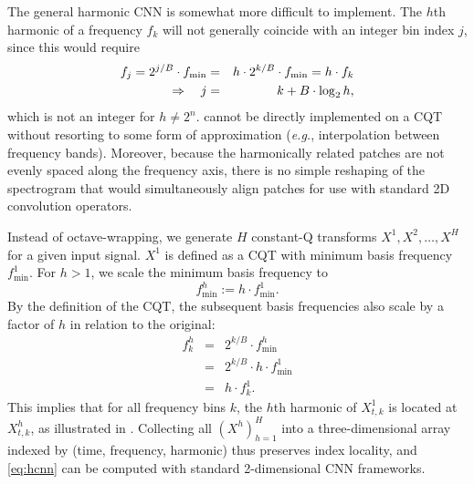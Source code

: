 \documentclass{article}
\begin{document}
The general harmonic CNN is somewhat more difficult to implement.
The $h$th harmonic of a frequency $f_k$ will not generally coincide with an integer bin index $j$, since this would require
\begin{eqnarray}
    f_j = 2^{j/B} \cdot f_{\min} &=& h \cdot 2^{k/B}\cdot f_{\min} = h \cdot f_k \notag \\
\Rightarrow \quad j &=& k + B \cdot \log_2 h,
\end{eqnarray}
which is not an integer for $h \neq 2^n$.
 cannot be directly implemented on a CQT without resorting to some form of approximation (\emph{e.g.}, interpolation between frequency bands).
Moreover, because the harmonically related patches are not evenly spaced along the frequency axis, there is no simple reshaping of the spectrogram that would simultaneously align patches for use with standard 2D convolution operators.

Instead of octave-wrapping, we generate $H$ constant-Q transforms $X^1, X^2, \dots, X^H$ for a given input signal.
$X^1$ is defined as a CQT with minimum basis frequency $f^1_{\min}$.
For $h > 1$, we scale the minimum basis frequency to
\begin{equation}
    f^h_{\min} := h \cdot f^1_{\min}.\label{eq:fmin}
\end{equation}
By the definition of the CQT, the subsequent basis frequencies also scale by a factor of $h$ in relation to the original:
\begin{eqnarray}
    f^h_k &=& 2^{k/B} \cdot f^h_{\min}\\
        &=& 2^{k/B} \cdot h \cdot f^1_{\min}\\
    &=& h \cdot f^1_k.
\end{eqnarray}
This implies that for all frequency bins $k$, the $h$th harmonic of $X^1_{t, k}$ is located at $X^h_{t, k}$, as illustrated in .
Collecting all $(X^h)_{h=1}^H$ into a three-dimensional array indexed by (time, frequency, harmonic) thus preserves index locality, and \cref{eq:hcnn} can be computed with standard 2-dimensional CNN frameworks.


\end{document}
